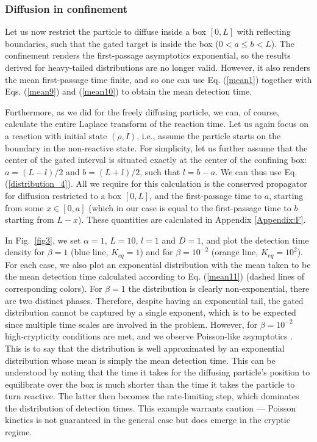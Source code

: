 \subsubsection*{Diffusion in confinement}\label{sub:confinement}

Let us now restrict the particle to diffuse inside a box $[0,L]$ with reflecting boundaries, such that the gated target is inside the box ($0<a \leq b<L$). The confinement renders the first-passage asymptotics exponential, so the results derived for heavy-tailed distributions are no longer valid. However, it also renders the mean first-passage time finite, and so one can use Eq. (\ref{mean1}) together with Eqs. (\ref{mean9}) and (\ref{mean10}) to obtain the mean detection time.

Furthermore, as we did for the freely diffusing particle, we can, of course, calculate the entire Laplace transform of the reaction time. Let us again focus on a reaction with initial state $(\rho,I)$, i.e., assume the particle starts on the boundary in the non-reactive state. For simplicity, let us further assume that the center of the gated interval is situated exactly at the center of the confining box: $a=(L-l)/2$ and $b=(L+l)/2$, such that $l=b-a$. We can thus use Eq. (\ref{distribution_4}). All we require for this calculation is the conserved propagator for diffusion restricted to a box $[0,L]$, and the first-passage time to $a$, starting from some $x \in [0,a]$ (which in our case is equal to the first-passage time to $b$ starting from $L-x$). These quantities are calculated in Appendix \ref{Appendix:F}.

In Fig.~\ref{fig3}, we set $\alpha=1$, $L=10$, $l=1$ and $D=1$, and plot the detection time density for $\beta=1$ (blue line, $K_{eq}=1$) and for $\beta=10^{-2}$ (orange line, $K_{eq}=10^{2}$). For each case, we also plot an exponential distribution with the mean taken to be the mean detection time calculated according to Eq. (\ref{mean11}) (dashed lines of corresponding colors).  For $\beta=1$ the distribution is clearly non-exponential, there are two distinct phases. Therefore, despite having an exponential tail, the gated distribution cannot be captured by a single exponent, which is to be expected since multiple time scales are involved in the problem. However, for $\beta=10^{-2}$ high-crypticity conditions are met, and we observe Poisson-like asymptotics \cite{godec_universal_2016}. This is to say that the distribution is well approximated by an exponential distribution whose mean is simply the mean detection time. This can be understood by noting that the time it takes for the diffusing particle's position to equilibrate over the box is much shorter than the time it takes the particle to turn reactive. The latter then becomes the rate-limiting step, which dominates the distribution of detection times. This example warrants caution --- Poisson kinetics is not guaranteed in the general case but does emerge in the cryptic regime. \\ 


